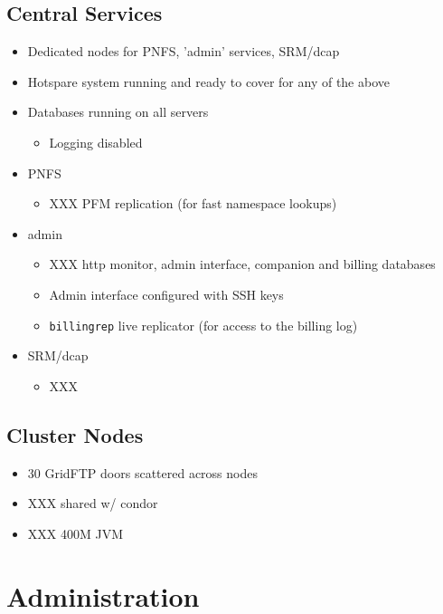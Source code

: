 \documentclass{beamer}
\begin{document}
\subsection{Central Services}
\begin{frame}
\begin{itemize}
	\item Dedicated nodes for PNFS, 'admin' services, SRM/dcap
	\item Hotspare system running and ready to cover for any of the above
	\item Databases running on all servers
	\begin{itemize}
		\item Logging disabled
	\end{itemize}
	\item PNFS
	\begin{itemize}
		\item XXX PFM replication (for fast namespace lookups)
	\end{itemize}
	\item admin
	\begin{itemize}
		\item XXX http monitor, admin interface, companion and billing databases
		\item Admin interface configured with SSH keys
		\item {\tt billingrep} live replicator (for access to the billing log)
	\end{itemize}
	\item SRM/dcap
	\begin{itemize}
		\item XXX
	\end{itemize}
\end{itemize}
\end{frame}

\subsection{Cluster Nodes}
\begin{frame}
\begin{itemize}
	\item 30 GridFTP doors scattered across nodes
	\item XXX shared w/ condor
	\item XXX 400M JVM
\end{itemize}
\end{frame}

\section{Administration}
\end{document}
